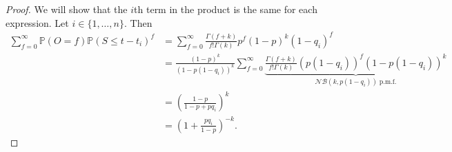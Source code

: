 \documentclass{article}
\begin{document}
\begin{proof}
We will show that the \(i\)th term in the product is the same for each expression. Let \(i \in \{1, \dots, n\}\). Then
\begin{align*}
    \sum_{f=0}^\infty \mathbb{P}(O = f) \mathbb{P}(S \leq t-t_i)^f
    &= \sum_{f=0}^\infty \frac{\Gamma(f+k)}{f! \Gamma(k)} p^f (1-p)^k (1-q_i)^f \\
    &= \frac{(1-p)^k}{(1-p(1-q_i))^k} \sum_{f=0}^\infty \underbrace{\frac{\Gamma(f+k)}{f! \Gamma(k)} (p(1-q_i))^f  (1-p(1-q_i))^k}_{\mathcal{NB}(k, p(1-q_i)) \;\text{p.m.f.}} \\
    &= \left(\frac{1-p}{1-p+pq_i}\right)^k \\
    &= \left(1 + \frac{pq_i}{1-p}\right)^{-k}.
\end{align*}

\end{proof}
\end{document}
